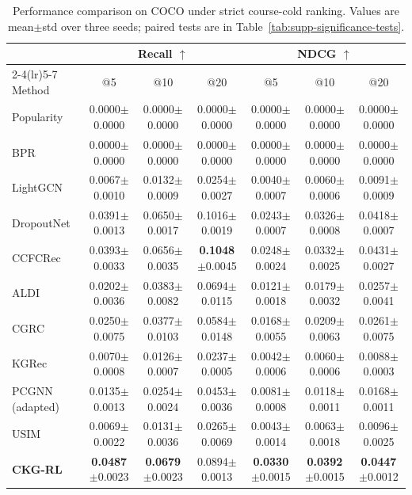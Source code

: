 \documentclass[letterpaper]{article}
\newcommand{\sd}[1]{{\footnotesize$\pm$#1}}
\newcommand{\tablecaptiongap}{\vspace{0.35em}}
\begin{document}
\begin{table}[t]
\centering
\caption{Performance comparison on COCO under strict course-cold ranking. Values are mean\(\pm\)std over three seeds; paired tests are in Table~\ref{tab:supp-significance-tests}.}
\label{tab:supp-coco-cold}
\tablecaptiongap
\small
\begin{tabular*}{\textwidth}{@{\extracolsep{\fill}}lcccccc}
\toprule
& \multicolumn{3}{c}{Recall \(\uparrow\)} & \multicolumn{3}{c}{NDCG \(\uparrow\)} \\
\cmidrule(lr){2-4}\cmidrule(lr){5-7}
Method & \multicolumn{1}{c}{@5} & \multicolumn{1}{c}{@10} & \multicolumn{1}{c}{@20} & \multicolumn{1}{c}{@5} & \multicolumn{1}{c}{@10} & \multicolumn{1}{c}{@20} \\
\midrule
Popularity & 0.0000\sd{0.0000} & 0.0000\sd{0.0000} & 0.0000\sd{0.0000} & 0.0000\sd{0.0000} & 0.0000\sd{0.0000} & 0.0000\sd{0.0000} \\
BPR & 0.0000\sd{0.0000} & 0.0000\sd{0.0000} & 0.0000\sd{0.0000} & 0.0000\sd{0.0000} & 0.0000\sd{0.0000} & 0.0000\sd{0.0000} \\
LightGCN & 0.0067\sd{0.0010} & 0.0132\sd{0.0009} & 0.0254\sd{0.0027} & 0.0040\sd{0.0007} & 0.0060\sd{0.0006} & 0.0091\sd{0.0009} \\
DropoutNet & 0.0391\sd{0.0013} & 0.0650\sd{0.0017} & 0.1016\sd{0.0019} & 0.0243\sd{0.0007} & 0.0326\sd{0.0008} & 0.0418\sd{0.0007} \\
CCFCRec & 0.0393\sd{0.0033} & 0.0656\sd{0.0035} & \textbf{0.1048}\sd{0.0045} & 0.0248\sd{0.0024} & 0.0332\sd{0.0025} & 0.0431\sd{0.0027} \\
ALDI & 0.0202\sd{0.0036} & 0.0383\sd{0.0082} & 0.0694\sd{0.0115} & 0.0121\sd{0.0018} & 0.0179\sd{0.0032} & 0.0257\sd{0.0041} \\
CGRC & 0.0250\sd{0.0075} & 0.0377\sd{0.0103} & 0.0584\sd{0.0148} & 0.0168\sd{0.0055} & 0.0209\sd{0.0063} & 0.0261\sd{0.0075} \\
KGRec & 0.0070\sd{0.0008} & 0.0126\sd{0.0007} & 0.0237\sd{0.0005} & 0.0042\sd{0.0006} & 0.0060\sd{0.0006} & 0.0088\sd{0.0003} \\
PCGNN (adapted) & 0.0135\sd{0.0013} & 0.0254\sd{0.0024} & 0.0453\sd{0.0036} & 0.0081\sd{0.0008} & 0.0118\sd{0.0011} & 0.0168\sd{0.0011} \\
USIM & 0.0069\sd{0.0022} & 0.0131\sd{0.0036} & 0.0265\sd{0.0069} & 0.0043\sd{0.0014} & 0.0063\sd{0.0018} & 0.0096\sd{0.0025} \\
\textbf{CKG-RL} & \textbf{0.0487}\sd{0.0023} & \textbf{0.0679}\sd{0.0023} & 0.0894\sd{0.0013} & \textbf{0.0330}\sd{0.0015} & \textbf{0.0392}\sd{0.0015} & \textbf{0.0447}\sd{0.0012} \\
\bottomrule
\end{tabular*}
\end{table}
\end{document}
